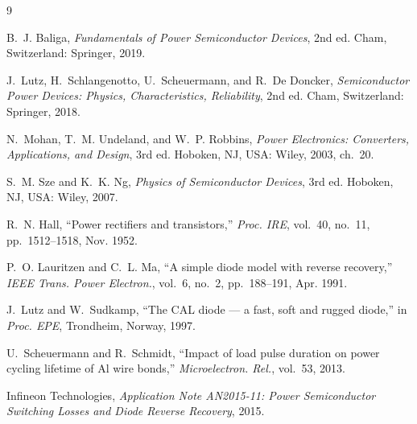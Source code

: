 \documentclass[11pt,a4paper]{article}
\begin{document}
\begin{thebibliography}{9}

B.~J. Baliga, \emph{Fundamentals of Power Semiconductor Devices}, 2nd ed.
Cham, Switzerland: Springer, 2019.

J.~Lutz, H.~Schlangenotto, U.~Scheuermann, and R.~De Doncker,
\emph{Semiconductor Power Devices: Physics, Characteristics, Reliability},
2nd ed. Cham, Switzerland: Springer, 2018.

N.~Mohan, T.~M. Undeland, and W.~P. Robbins, \emph{Power Electronics:
Converters, Applications, and Design}, 3rd ed. Hoboken, NJ, USA: Wiley, 2003,
ch.~20.

S.~M. Sze and K.~K. Ng, \emph{Physics of Semiconductor Devices}, 3rd ed.
Hoboken, NJ, USA: Wiley, 2007.

R.~N. Hall, ``Power rectifiers and transistors,''
\emph{Proc. IRE}, vol.~40, no.~11, pp.~1512--1518, Nov. 1952.

P.~O. Lauritzen and C.~L. Ma, ``A simple diode model with reverse recovery,''
\emph{IEEE Trans. Power Electron.}, vol.~6, no.~2, pp.~188--191, Apr. 1991.

J.~Lutz and W.~Sudkamp, ``The CAL diode --- a fast, soft and rugged diode,''
in \emph{Proc. EPE}, Trondheim, Norway, 1997.

U.~Scheuermann and R.~Schmidt, ``Impact of load pulse duration on power cycling
lifetime of Al wire bonds,'' \emph{Microelectron. Rel.}, vol.~53, 2013.

Infineon Technologies, \emph{Application Note AN2015-11: Power Semiconductor
Switching Losses and Diode Reverse Recovery}, 2015.

\end{thebibliography}
\end{document}

